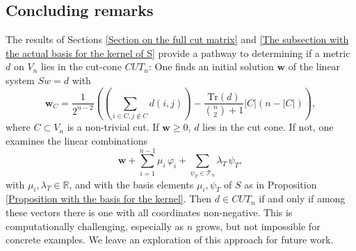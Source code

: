 \documentclass[12pt]{amsart}
\numberwithin{theorem}{section}
\theoremstyle{remark}
\begin{document}
\subsection{Concluding remarks} 
The results of Sections \ref{Section on the full cut matrix} and \ref{The subsection with the actual basis for the kernel of S} provide a pathway to determining if a metric $d$ on $V_n$ lies in the cut-cone $CUT_n$: One finds an initial solution $\mathbf w$ of the linear system $Sw=d$ with 
%
$$\mathbf w_C =  \frac{1}{2^{n-2}} \left( \left( \sum_{i\in C, j\notin C} d(i,j)\right) - \frac{\text{Tr}(d)}{{n \choose 2}+1} |C|(n-|C|) \right),$$
%
where $C\subset V_n$ is a non-trivial cut. If $\mathbf w\ge 0$, $d$ lies in the cut cone. If not, one examines the linear combinations 
$$\mathbf{w} + \sum_{i=1}^{n-1}\mu_i \,\varphi_i + \sum _{\psi_T\in \mathcal T_n}\lambda _T\, \psi_T,$$
with $\mu_i, \lambda _T\in \mathbb R$, and with the basis elements $\mu_i, \psi_T$ of $S$ as in Proposition \ref{Proposition with the basis for the kernel}. Then $d\in CUT_n$ if and only if among these vectors there is one with all coordinates non-negative. This is computationally challenging, especially as $n$ grows, but not impossible for concrete examples. We leave an exploration of this approach for future work.  




\end{document}
